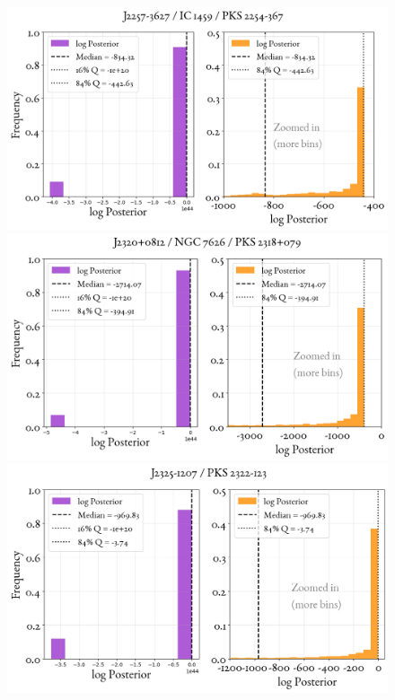 \begin{figure}
    \centering
    \includegraphics[width=0.8\linewidth]{figures/ResultPosteriors/82_Posterior_5061.png}\\
     \includegraphics[width=0.8\linewidth]{figures/ResultPosteriors/83_Posterior_5120.png}\\
      \includegraphics[width=0.8\linewidth]{figures/ResultPosteriors/85_Posterior_5132.png}  
\end{figure}


